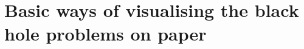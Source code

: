 \documentclass[english, a4, 12pt]{scrartcl}
\begin{document}
	
			
\section{Basic ways of visualising the black hole problems on paper}
	
	
	
			

		

	

 






\end{document}
